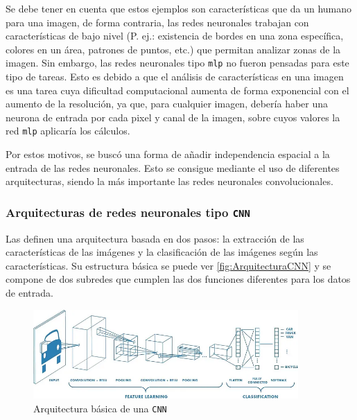 Se debe tener en cuenta que estos ejemplos son características que da un humano para una imagen, de forma contraria, las redes neuronales trabajan con características de bajo nivel (P. ej.: existencia de bordes en una zona específica, colores en un área, 
patrones de puntos, etc.) que permitan analizar zonas de la imagen. Sin embargo, las redes neuronales tipo \texttt{\acrshort{mlp}} no fueron pensadas para este tipo de tareas. Esto es debido a que el 
análisis de características en una imagen es una tarea cuya dificultad computacional aumenta de forma exponencial con el aumento de la resolución, ya que, para cualquier imagen, debería haber una neurona de entrada por 
cada pixel y canal de la imagen, sobre cuyos valores la red \texttt{\acrshort{mlp}} aplicaría los cálculos.

Por estos motivos, se buscó una forma de añadir independencia espacial a la entrada de las redes neuronales. Esto se consigue mediante el uso de diferentes arquitecturas, siendo la más importante las redes 
neuronales convolucionales.\newline

\subsubsection{Arquitecturas de redes neuronales tipo \texttt{CNN}}

Las \texttt{} definen una arquitectura basada en dos pasos: la extracción de las características de las imágenes y la clasificación de las imágenes según las características. Su estructura básica se 
puede ver \autoref{fig:ArquitecturaCNN} y  se compone de dos subredes que cumplen las dos funciones diferentes para los datos de entrada.

\begin{figure}[H]
    \centering
    \includegraphics[width=0.9\textwidth]{images/4/ArquitecturaCNN.png}
    \caption{Arquitectura básica de una \texttt{CNN}\cite{sahaComprehensiveGuideConvolutional2022}}
    \label{fig:ArquitecturaCNN}
\end{figure}

